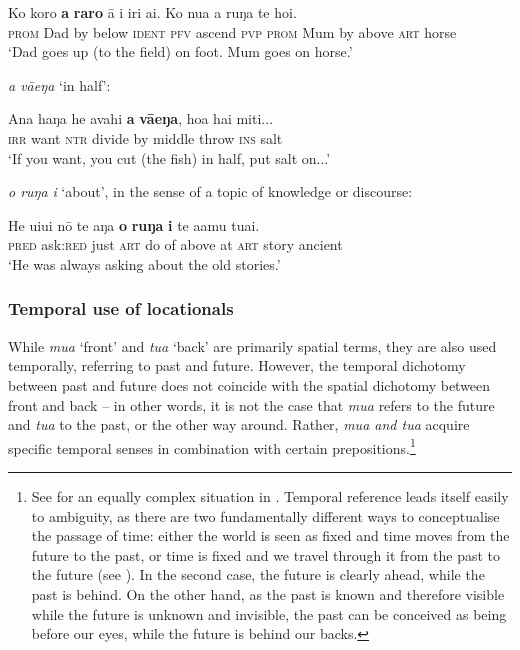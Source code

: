 \ea\label{ex:3.150}
\gll Ko koro \textbf{a} \textbf{raro} {\ꞌ}ā i iri ai. Ko nua a ruŋa te hoi. \\
\textsc{prom} Dad by below \textsc{ident} \textsc{pfv} ascend \textsc{pvp} \textsc{prom} Mum by above \textsc{art} horse \\

\glt
‘Dad goes up (to the field) on foot. Mum goes on horse.’ \textstyleExampleref{[R184.052–053]}
\z

\newpage 
\textit{a vāeŋa} ‘in half’:


\ea\label{ex:3.151}
\gll Ana haŋa he {\ꞌ}avahi \textbf{a} \textbf{vāeŋa}, hoa hai miti...\\
\textsc{irr} want \textsc{ntr} divide by middle throw \textsc{ins} salt\\

\glt
‘If you want, you cut (the fish) in half, put salt on...’ \textstyleExampleref{[R185.007]}
\z

\textit{o ruŋa} \textit{i} ‘about’, in the sense of a topic of knowledge or discourse:

\ea\label{ex:3.152}
\gll He {\ꞌ}ui{\ꞌ}ui nō te aŋa \textbf{o} \textbf{ruŋa} \textbf{i} te {\ꞌ}a{\ꞌ}amu tuai. \\
\textsc{pred} ask:\textsc{red} just \textsc{art} do of above at \textsc{art} story ancient \\

\glt 
‘He was always asking about the old stories.’ \textstyleExampleref{[R302.018]} 
\z

\subsubsection[Temporal use of locationals]{Temporal use of locationals}\label{sec:3.6.2.4}

While \textit{mu{\ꞌ}a} ‘front’ and \textit{tu{\ꞌ}a} ‘back’ are primarily spatial terms, they are also used temporally, referring to past and future. However, the temporal dichotomy between past and future does not coincide with the spatial dichotomy between front and back – in other words, it is not the case that \textit{mu{\ꞌ}a} refers to the future and \textit{tu{\ꞌ}a} to the past, or the other way around. Rather, \textit{mu{\ꞌ}a and tu{\ꞌ}a} acquire specific temporal senses in combination with certain prepositions.\footnote{\label{fn:147}See \citet{Tetahiotupa2005} for an equally complex situation in . Temporal reference leads itself easily to ambiguity, as there are two fundamentally different ways to conceptualise the passage of time: either the world is seen as fixed and time moves from the future to the past, or time is fixed and we travel through it from the past to the future (see \citealt[296]{AndersonKeenan1985}). In the second case, the future is clearly ahead, while the past is behind. On the other hand, as the past is known and therefore visible while the future is unknown and invisible, the past can be conceived as being before our eyes, while the future is behind our backs.}

